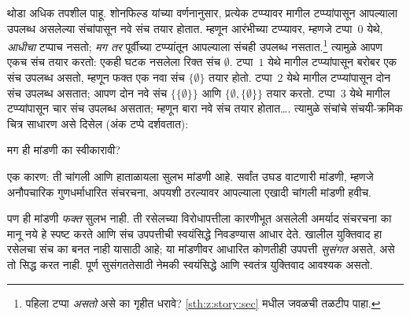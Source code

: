 थोडा अधिक
तपशील पाहू.
शोनफिल्ड
यांच्या
वर्णनानुसार,
प्रत्येक
टप्प्यावर
मागील
टप्प्यांपासून
आपल्याला
उपलब्ध
असलेल्या
संचांपासून
नवे संच
तयार होतात.
म्हणून
आरंभीच्या
टप्प्यावर,
म्हणजे
टप्पा~$0$
येथे,
\emph{आधीचा}
टप्पाच
नसतो;
\emph{मग तर}
पूर्वीच्या
टप्प्यांतून
आपल्याला
संचही
उपलब्ध
नसतात.\footnote{
  पहिला
  टप्पा
  \emph{असतो}
  असे का
  गृहीत
  धरावे?
  \ref{sth:z:story:sec}
  मधील
  \stagesord{}
  जवळची
  तळटीप
  पाहा.}
त्यामुळे
आपण
एकच संच
तयार करतो:
एकही
घटक
नसलेला
रिक्त संच
$\emptyset$.
टप्पा~$1$
येथे
मागील
टप्प्यांपासून
बरोबर
एक संच
उपलब्ध
असतो,
म्हणून
फक्त एक
नवा संच
$\{\emptyset\}$
तयार होतो.
टप्पा~$2$
येथे मागील
टप्प्यांपासून
दोन संच
उपलब्ध
असतात;
आपण दोन
नवे संच
$\{\{\emptyset\}\}$
आणि
$\{\emptyset,
\{\emptyset\}\}$
तयार करतो.
टप्पा~$3$
येथे मागील
टप्प्यांपासून
चार संच
उपलब्ध
असतात;
म्हणून
बारा
नवे संच
तयार
होतात\ldots.
त्यामुळे
संचांचे
संचयी-क्रमिक
चित्र
साधारण
असे
दिसेल
(अंक टप्पे
दर्शवतात):
\begin{center}
\end{center}
मग ही मांडणी
का स्वीकारावी?

एक कारण:
ती चांगली
आणि हाताळायला
सुलभ मांडणी
आहे. सर्वांत
उघड वाटणारी
मांडणी,
म्हणजे
अनौपचारिक
गुणधर्माधारित
संचरचना,
अपयशी ठरल्यावर
आपल्याला
एखादी चांगली
मांडणी हवीच.

पण ही मांडणी \emph{फक्त} सुलभ नाही.
ती रसेलच्या विरोधापत्तीला कारणीभूत असलेली
अमर्याद संचरचना का मानू नये हे स्पष्ट करते
आणि संच उपपत्तीची स्वयंसिद्धे निवडण्यास आधार देते.
खालील युक्तिवाद हा रसेलचा संच का बनत नाही यासाठी आहे;
या मांडणीवर आधारित कोणतीही उपपत्ती \emph{सुसंगत} असते,
असे तो सिद्ध करत नाही. पूर्ण सुसंगततेसाठी
नेमकी स्वयंसिद्धे आणि स्वतंत्र युक्तिवाद आवश्यक असतो.

